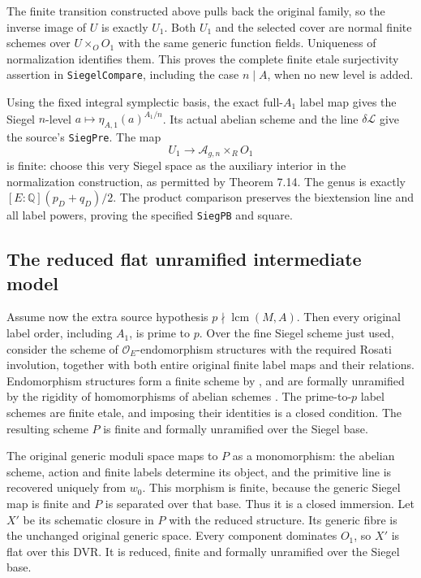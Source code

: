 The finite transition constructed above pulls back the original
family, so the inverse image of $U$ is exactly $U_1$.
Both $U_1$ and the selected cover are normal finite schemes over
$U\times_OO_1$ with the same generic function fields.  Uniqueness
of normalization identifies them.  This proves the complete finite
etale surjectivity assertion in \texttt{SiegelCompare}, including
the case $n\mid A$, when no new level is added.

Using the fixed integral symplectic basis, the exact full-$A_1$
label map gives the Siegel $n$-level
$a\mapsto\eta_{A,1}(a)^{A_1/n}$.  Its actual abelian scheme and
the line $\delta\mathcal L$ give the source's \texttt{SiegPre}.
The map
\[
                     U_1\longrightarrow \mathcal A_{g,n}\times_R O_1
\]
is finite: choose this very Siegel space as the auxiliary interior
in the normalization construction, as permitted by Theorem 7.14.
The genus is exactly $[E:\mathbb Q](p_D+q_D)/2$.
The product comparison preserves the biextension line and all
label powers, proving the specified \texttt{SiegPB} and square.

\subsection*{The reduced flat unramified intermediate model}

Assume now the extra source hypothesis $p\nmid\operatorname{lcm}(M,A)$.
Then every original label order, including $A_1$, is prime to $p$.
Over the fine Siegel scheme just used, consider the scheme of
$\mathcal O_E$-endomorphism structures with the required Rosati
involution, together with both entire original finite label maps and their
relations.  Endomorphism structures form a finite scheme by
\cite[Proposition 1.3.3.7]{level-system-lan}, and are formally
unramified by the rigidity of homomorphisms of abelian schemes
\cite[Lemma 2.2.2.1]{level-system-lan}.  The prime-to-$p$ label
schemes are finite etale, and imposing their identities is a closed
condition.  The resulting scheme $P$ is finite and formally
unramified over the Siegel base.

The original generic moduli space maps to $P$ as a monomorphism:
the abelian scheme, action and finite labels determine its object,
and the primitive line is recovered uniquely from $w_0$.
This morphism is finite, because the generic Siegel map is finite
and $P$ is separated over that base.  Thus it is a closed immersion.
Let $X'$ be its schematic closure in $P$ with the reduced structure.
Its generic fibre is the unchanged original generic space.  Every
component dominates $O_1$, so $X'$ is flat over this DVR.  It is
reduced, finite and formally unramified over the Siegel base.

